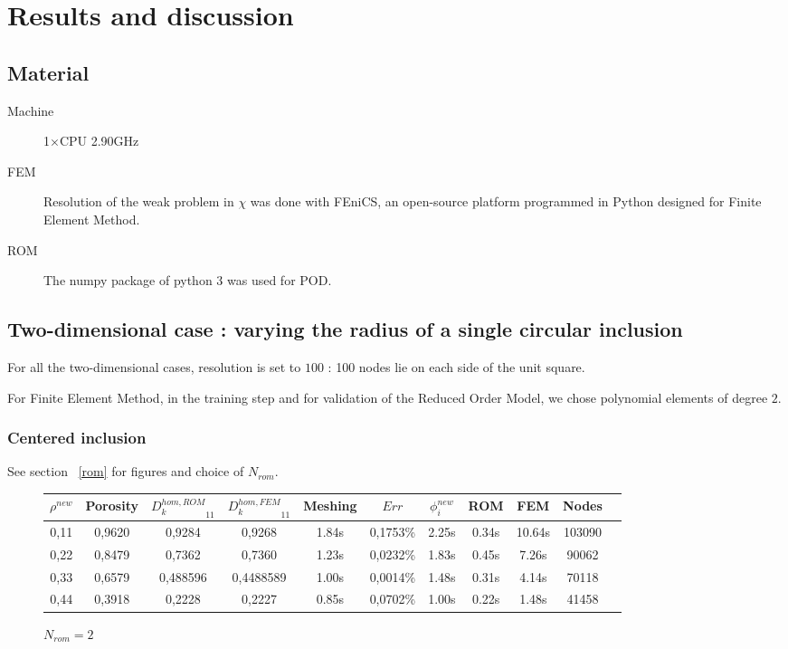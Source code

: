 \section{Results and discussion}\label{res}

\subsection{Material}

\begin{description}
\item [Machine] 1$\times$CPU 2.90GHz
\item [FEM] Resolution of the weak problem in $\chi$ was done with FEniCS, %
an open-source platform programmed in Python designed for Finite Element Method.
\item [ROM] The numpy package of python 3 was used for POD.
\end{description}

\subsection{Two-dimensional case : varying the radius of a single circular inclusion}

For all the two-dimensional cases, resolution is set to $100$ : %
100 nodes lie on each side of the unit square.

\par
For Finite Element Method, in the training step and for validation of the Reduced Order Model, we chose polynomial elements of degree $2$.

\subsubsection{Centered inclusion}

See section \ \ref{rom} for figures and choice of $N_{rom}$.
\begin{figure}[H]%
%
\begin{center}
\begin{tabular}{|c|c||c|c||c|c||c||c|c||c||c|}
\hline
$\rho^{new}$&Porosity&${D_k^{hom,ROM}}_{11}$&${D_k^{hom,FEM}}_{11}$&Meshing&$Err$&$\phi_i^{new}$&ROM&FEM&Nodes\\
\hline
0,11&0,9620&0,9284&0,9268&1.84s&0,1753\%&2.25s&0.34s&10.64s&103090\\
\hline
0,22&0,8479&0,7362&0,7360&1.23s&0,0232\%&1.83s&0.45s&7.26s&90062\\
\hline
0,33&0,6579&0,488596&0,4488589&1.00s&0,0014\%&1.48s&0.31s&4.14s&70118\\
\hline
0,44&0,3918&0,2228&0,2227&0.85s&0,0702\%&1.00s&0.22s&1.48s&41458\\
\hline
\end{tabular}
\end{center}
\caption{$N_{rom}=2$}
%
\end{figure}

